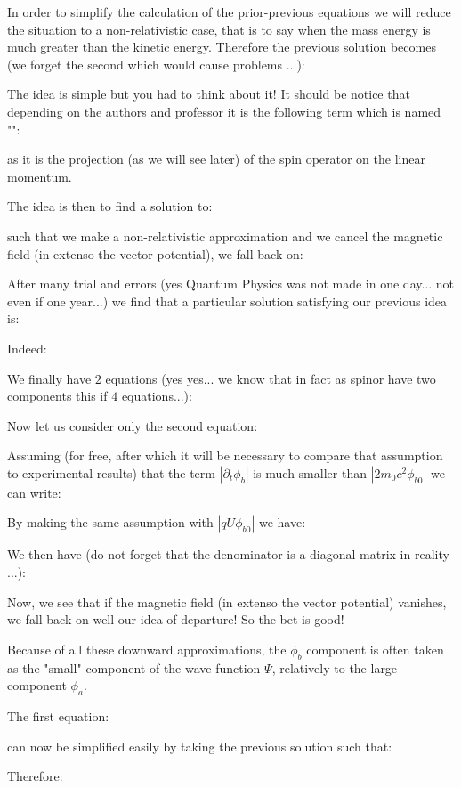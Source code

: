 	In order to simplify the calculation of the prior-previous equations we will reduce the situation to a non-relativistic case, that is to say when the mass energy is much greater than the kinetic energy. Therefore the previous solution becomes (we forget the second which would cause problems ...):
	
	The idea is simple but you had to think about it! It should be notice that depending on the authors and professor it is the following term which is named "":
	
	as it is the projection (as we will see later) of the spin operator on the linear momentum.
	
	The idea is then to find a solution to:
	
	such that we make a non-relativistic approximation and we cancel the magnetic field (in extenso the vector potential), we fall back on:
	
	After many trial and errors (yes Quantum Physics was not made in one day... not even if one year...) we find that a particular solution satisfying our previous idea is:
	
	Indeed:
	
	We finally have $2$ equations (yes yes... we know that in fact as spinor have two components this if $4$ equations...):
	
	Now let us consider only the second equation:
	
	Assuming (for free, after which it will be necessary to compare that assumption to experimental results) that the term $|\partial_t \phi_b|$ is much smaller than $|2m_0c^2\phi_{b0}|$ we can write:
	
	By making the same assumption with $|qU\phi_{b0}|$ we have:
	
	We then have (do not forget that the denominator is a diagonal matrix in reality ...):
	
	Now, we see that if the magnetic field (in extenso the vector potential) vanishes, we fall back on well our idea of departure! So the bet is good!

	Because of all these downward approximations, the $\phi_b$ component is often taken as the "small" component of the wave function $\Psi$, relatively to the large component $\phi_a$.

	The first equation:
	
	can now be simplified easily by taking the previous solution such that:
	
	Therefore:
	
